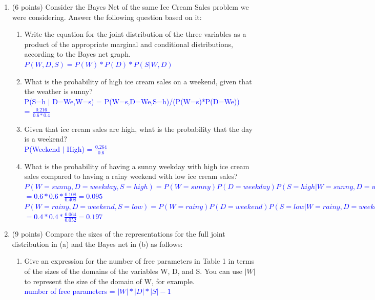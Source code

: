 \documentclass[12pt]{article}
\newenvironment{qparts}{\begin{enumerate}[{(}a{)}]}{\end{enumerate}}
\newenvironment{qsubparts}{\begin{enumerate}[{(}i{)}]}{\end{enumerate}}
\begin{document}
\begin{qparts}
  \item (6 points) Consider the Bayes Net of the same Ice Cream Sales problem we were considering. Answer the following question based on it:
  \begin{qsubparts}
    \item Write the equation for the joint distribution of the three variables as a product of the appropriate marginal and conditional distributions, according to the Bayes net graph.\\
    \textcolor{blue}{$P(W,D,S) = P(W)*P(D)*P(S|W,D)$}
    \item What is the probability of high ice cream sales on a weekend, given that the weather is sunny?\\
    \textcolor{blue}{P(S=h $\mid$ D=We,W=s) = P(W=s,D=We,S=h)/(P(W=s)*P(D=We))\\ = $\frac{0.216}{0.6*0.4}$}
    \item Given that ice cream sales are high, what is the probability that the day is a weekend?\\
    \textcolor{blue}{P(Weekend $\mid$ High) = $\frac{0.264}{0.6}$}
    \item What is the probability of having a sunny weekday with high ice cream sales compared to having a rainy weekend with low ice cream sales?\\
    \textcolor{blue}{$P(W = sunny, D = weekday, S = high) = P(W = sunny)P(D = weekday)P(S = high|W = sunny, D = weekday)$}\\
    \textcolor{blue}{$= 0.6 * 0.6 * \frac{0.108}{0.408} = 0.095$}\\
    \textcolor{blue}{$P(W = rainy, D = weekend, S = low) = P(W = rainy)P(D = weekend)P(S = low|W = rainy, D = weekend)$}\\
    \textcolor{blue}{$= 0.4 * 0.4 * \frac{0.064}{0.052} = 0.197$}
  \end{qsubparts}
  \newpage
  \item (9 points) Compare the sizes of the representations for the full joint distribution in (a)
  and the Bayes net in (b) as follows:
  \begin{qsubparts}
    \item
    Give an expression for the number of free parameters in Table 1 in terms of the
    sizes of the domains of the variables W, D, and S.  You can use $|W|$ to represent
    the size of the domain of W, for example.\\
    \textcolor{blue}{number of free parameters = $|W|*|D|*|S| - 1$}


\end{qsubparts}
\end{qparts}
\end{document}
